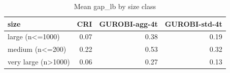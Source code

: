 \begin{table}[htbp]
\centering
\small
\caption{Mean gap\_lb by size class}
\label{tab:E7_gurobi_threads_b60_by_size}
\begin{tabular}{lrrr}
\toprule
size & CRI & GUROBI-agg-4t & GUROBI-std-4t \\
\midrule
large (n<=1000) & 0.07 & 0.38 & 0.19 \\
medium (n<=200) & 0.22 & 0.53 & 0.32 \\
very large (n>1000) & 0.06 & 0.27 & 0.13 \\
\bottomrule
\end{tabular}
\end{table}
